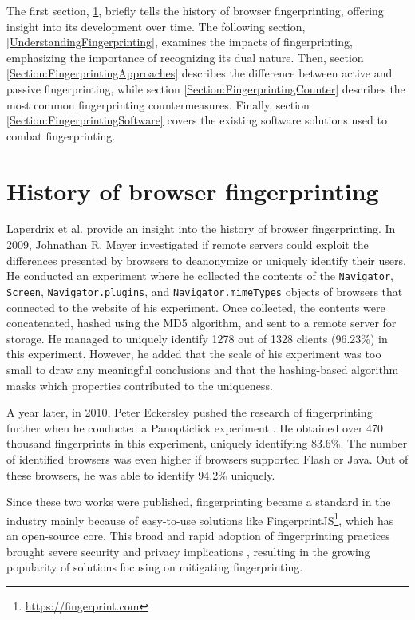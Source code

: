 The first section, \ref{Section:FingerprintingHistory}, briefly tells the history of browser fingerprinting, offering insight into its development over time. The following section, \ref{UnderstandingFingerprinting}, examines the impacts of fingerprinting, emphasizing the importance of recognizing its dual nature. Then, section \ref{Section:FingerprintingApproaches} describes the difference between active and passive fingerprinting, while section \ref{Section:FingerprintingCounter} describes the most common fingerprinting countermeasures. Finally, section \ref{Section:FingerprintingSoftware} covers the existing software solutions used to combat fingerprinting.

\section{History of browser fingerprinting}
\label{Section:FingerprintingHistory}

Laperdrix et al. \cite{FingerprintingSurvey} provide an insight into the history of browser fingerprinting. In 2009, Johnathan R. Mayer investigated \cite{MayerAnyPerson} if remote servers could exploit the differences presented by browsers to deanonymize or uniquely identify their users. He conducted an experiment where he collected the contents of the \texttt{Navigator}, \texttt{Screen}, \texttt{Navigator.plugins}, and \texttt{Navigator.mimeTypes} objects of browsers that connected to the website of his experiment. Once collected, the contents were concatenated, hashed using the MD5 algorithm, and sent to a remote server for storage. He managed to uniquely identify 1278 out of 1328 clients (96.23\%) in this experiment. However, he added that the scale of his experiment was too small to draw any meaningful conclusions and that the hashing-based algorithm masks which properties contributed to the uniqueness.

A year later, in 2010, Peter Eckersley pushed the research of fingerprinting further when he conducted a Panopticlick experiment \cite{EckersleyHowUnique}. He obtained over 470 thousand fingerprints in this experiment, uniquely identifying 83.6\%. The number of identified browsers was even higher if browsers supported Flash or Java. Out of these browsers, he was able to identify 94.2\% uniquely.

Since these two works were published, fingerprinting became a standard in the industry mainly because of easy-to-use solutions like FingerprintJS\footnote{\url{https://fingerprint.com}}, which has an open-source core. This broad and rapid adoption of fingerprinting practices brought severe security and privacy implications \cite{WP224Fingerprinting}, resulting in the growing popularity of solutions focusing on mitigating fingerprinting.

